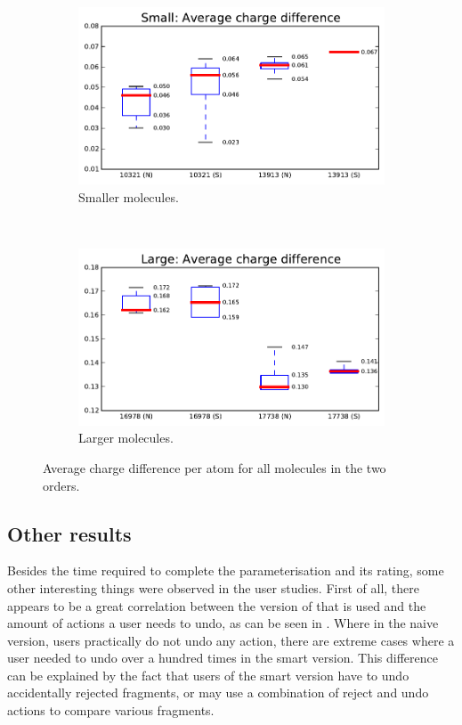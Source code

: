 \begin{figure}[h!]
\centering
\begin{subfigure}[t]{0.48\textwidth}
\centering
\includegraphics[width=\textwidth]{img/graphs/1c_01.pdf}
\caption{Smaller molecules.}
\end{subfigure}%
~
\begin{subfigure}[t]{0.48\textwidth}
\centering
\includegraphics[width=\textwidth]{img/graphs/1d_01.pdf}
\caption{Larger molecules.}
\end{subfigure}
\caption{Average charge difference per atom for all molecules in the two orders.}
\end{figure}

\subsection{Other results}
Besides the time required to complete the parameterisation and its rating, some other interesting things were observed in the user studies. First of all, there appears to be a great correlation between the version of \oframp{} that is used and the amount of actions a user needs to undo, as can be seen in . Where in the naive version, users practically do not undo any action, there are extreme cases where a user needed to undo over a hundred times in the smart version. This difference can be explained by the fact that users of the smart version have to undo accidentally rejected fragments, or may use a combination of reject and undo actions to compare various fragments.

